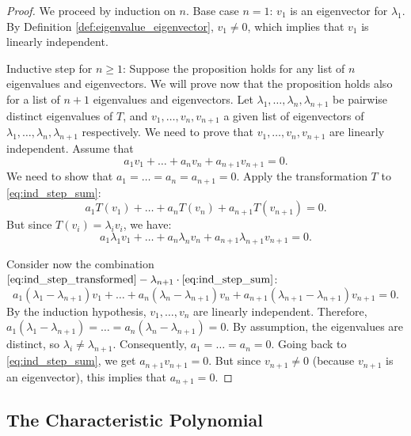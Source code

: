 \begin{proof}
  We proceed by induction on $n$.
  Base case $n=1$: $v_1$ is an eigenvector for $\lambda_1$. By Definition \ref{def:eigenvalue_eigenvector}, $v_1 \ne 0$, which implies that $v_1$ is linearly independent.

  Inductive step for $n \ge 1$: Suppose the proposition holds for any list of $n$ eigenvalues and eigenvectors. We will prove now that the proposition holds also for a list of $n+1$ eigenvalues and eigenvectors.
  Let $\lambda_1, \dots, \lambda_n, \lambda_{n+1}$ be pairwise distinct eigenvalues of $T$, and $v_1, \dots, v_n, v_{n+1}$ a given list of eigenvectors of $\lambda_1, \dots, \lambda_n, \lambda_{n+1}$ respectively. We need to prove that $v_1, \dots, v_n, v_{n+1}$ are linearly independent.
  Assume that
  \begin{equation} \label{eq:ind_step_sum} %
    a_1 v_1 + \dots + a_n v_n + a_{n+1} v_{n+1} = 0.
  \end{equation}
  We need to show that $a_1 = \dots = a_n = a_{n+1} = 0$.
  Apply the transformation $T$ to \eqref{eq:ind_step_sum}:
  \[ a_1 T(v_1) + \dots + a_n T(v_n) + a_{n+1} T(v_{n+1}) = 0. \]
  But since $T(v_i) = \lambda_i v_i$, we have:
  \begin{equation} \label{eq:ind_step_transformed}
    a_1 \lambda_1 v_1 + \dots + a_n \lambda_n v_n + a_{n+1} \lambda_{n+1} v_{n+1} = 0.
  \end{equation}

  Consider now the combination $\eqref{eq:ind_step_transformed} - \lambda_{n+1} \cdot \eqref{eq:ind_step_sum}$:
  \[ a_1(\lambda_1 - \lambda_{n+1})v_1 + \dots + a_n(\lambda_n - \lambda_{n+1})v_n + a_{n+1}(\lambda_{n+1} - \lambda_{n+1})v_{n+1} = 0. \]
  By the induction hypothesis, $v_1, \dots, v_n$ are linearly independent.
  Therefore, $a_1(\lambda_1 - \lambda_{n+1}) = \dots = a_n(\lambda_n - \lambda_{n+1}) = 0$.
  By assumption, the eigenvalues are distinct, so $\lambda_i \ne \lambda_{n+1}$. Consequently, $a_1 = \dots = a_n = 0$.
  Going back to \eqref{eq:ind_step_sum}, we get $a_{n+1} v_{n+1} = 0$.
  But since $v_{n+1} \ne 0$ (because $v_{n+1}$ is an eigenvector), this implies that $a_{n+1} = 0$.
\end{proof}

\subsection{The Characteristic Polynomial}

